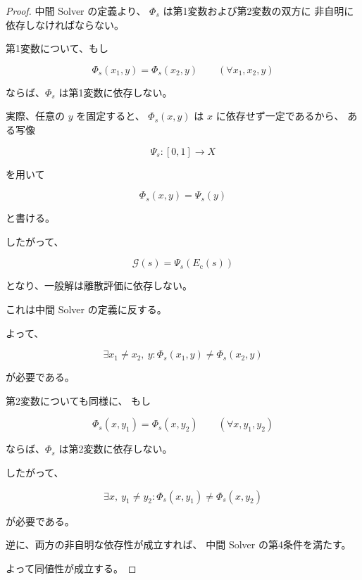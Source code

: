 \documentclass[a4paper,11pt]{article}
\newcommand{\Eval}{\mathcal{G}}
\begin{document}
\begin{proof}
中間 Solver の定義より、
$\Phi_s$ は第1変数および第2変数の双方に
非自明に依存しなければならない。

第1変数について、もし

\begin{equation}
    \Phi_s(x_1,y)
    =
    \Phi_s(x_2,y)
    \qquad
    (\forall x_1,x_2,y)
\end{equation}

ならば、$\Phi_s$ は第1変数に依存しない。

実際、任意の $y$ を固定すると、
$\Phi_s(x,y)$ は $x$ に依存せず一定であるから、
ある写像

\begin{equation}
    \Psi_s:[0,1]\to X
\end{equation}

を用いて

\begin{equation}
    \Phi_s(x,y)=\Psi_s(y)
\end{equation}

と書ける。

したがって、

\begin{equation}
    \Eval(s)
    =
    \Psi_s(E_{\mathrm c}(s))
\end{equation}

となり、一般解は離散評価に依存しない。

これは中間 Solver の定義に反する。

よって、

\begin{equation}
    \exists x_1\neq x_2,\ y:
    \Phi_s(x_1,y)\neq\Phi_s(x_2,y)
\end{equation}

が必要である。

第2変数についても同様に、
もし

\begin{equation}
    \Phi_s(x,y_1)
    =
    \Phi_s(x,y_2)
    \qquad
    (\forall x,y_1,y_2)
\end{equation}

ならば、$\Phi_s$ は第2変数に依存しない。

したがって、

\begin{equation}
    \exists x,\ y_1\neq y_2:
    \Phi_s(x,y_1)\neq\Phi_s(x,y_2)
\end{equation}

が必要である。

逆に、両方の非自明な依存性が成立すれば、
中間 Solver の第4条件を満たす。

よって同値性が成立する。
\end{proof}
\end{document}
